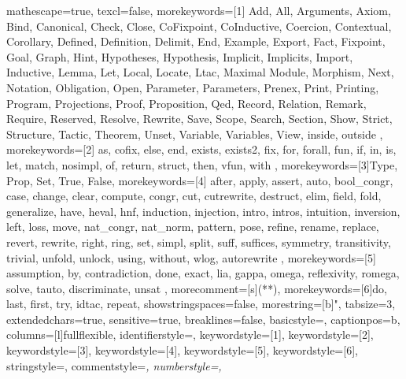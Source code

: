 
 {
mathescape=true,						
texcl=false,
morekeywords=[1]{
  Add,
  All,
  Arguments,
  Axiom,
  Bind,
  Canonical,
  Check,
  Close,
  CoFixpoint,
  CoInductive,
  Coercion,
  Contextual,
  Corollary,
  Defined,
  Definition,
  Delimit,
  End,
  Example,
  Export,
  Fact,
  Fixpoint,
  Goal,
  Graph,
  Hint,
  Hypotheses,
  Hypothesis,
  Implicit,
  Implicits,
  Import,
  Inductive,
  Lemma,
  Let,
  Local,
  Locate,
  Ltac,
  Maximal
  Module,
  Morphism,
  Next,
  Notation,
  Obligation,
  Open,
  Parameter,
  Parameters,
  Prenex,
  Print,
  Printing,
  Program,
  Projections,
  Proof,
  Proposition,
  Qed,
  Record,
  Relation,
  Remark,
  Require,
  Reserved,
  Resolve,
  Rewrite,
  Save,
  Scope,
  Search,
  Section,
  Show,
  Strict,
  Structure,
  Tactic,
  Theorem,
  Unset,
  Variable,
  Variables,
  View,
  inside,
  outside
},
morekeywords=[2]{
  as,
  cofix,
  else,
  end,
  exists,
  exists2,
  fix,
  for,
  forall,
  fun,
  if,
  in,
  is,
  let,
  match,
  nosimpl,
  of,
  return,
  struct,
  then,
  vfun,
  with
},
morekeywords=[3]{Type, Prop, Set, True, False},
morekeywords=[4]{
  after,
  apply,
  assert,
  auto,
  bool_congr,
  case,
  change,
  clear,
  compute,
  congr,
  cut,
  cutrewrite,
  destruct,
  elim,
  field,
  fold,
  generalize,
  have,
  heval, 
  hnf,
  induction,
  injection,
  intro,
  intros,
  intuition,
  inversion,
  left,
  loss,
  move,
  nat_congr,
  nat_norm,
  pattern,
  pose,
  refine,
  rename,
  replace,
  revert,
  rewrite,
  right,
  ring,
  set,
  simpl,
  split,
  suff,
  suffices,
  symmetry,
  transitivity,
  trivial,
  unfold,
  unlock,
  using,
  without,
  wlog,
  autorewrite
},        
morekeywords=[5]{
  assumption,
  by,
  contradiction,
  done,
  exact,
  lia,
  gappa,
  omega,
  reflexivity,
  romega,
  solve,
  tauto,
  discriminate,
  unsat
},
morecomment=[s]{(*}{*)},
morekeywords=[6]{do, last, first, try, idtac, repeat},
showstringspaces=false,
morestring=[b]",
tabsize=3,							
extendedchars=true,  		 		
sensitive=true, 
breaklines=false,
basicstyle=\scriptsize\ttfamily,
captionpos=b,							
columns=[l]fullflexible,
identifierstyle={\color{black}},
keywordstyle=[1]{\color{violet}},
keywordstyle=[2]{\color{forestgreen}},
keywordstyle=[3]{\color{forestgreen}},
keywordstyle=[4]{\color{blue}},
keywordstyle=[5]{\color{red}},
keywordstyle=[6]{\color{violet}},
stringstyle=,
commentstyle=\it\ttfamily\color{Bittersweet},
numberstyle=\tiny,
}

